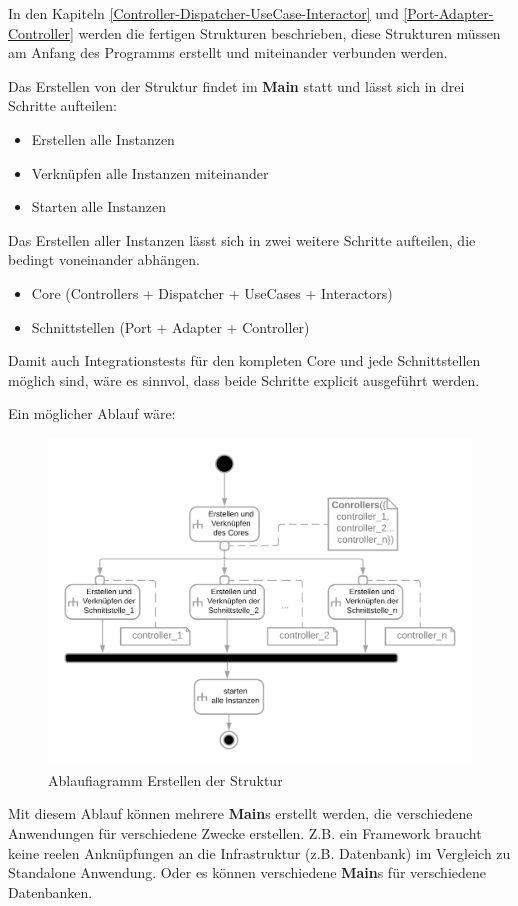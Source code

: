 In den Kapiteln \ref{Controller-Dispatcher-UseCase-Interactor} und \ref{Port-Adapter-Controller} 
werden die fertigen Strukturen beschrieben, diese Strukturen müssen am Anfang des Programms erstellt
und miteinander verbunden werden.

Das Erstellen von der Struktur findet im \textbf{Main} statt und lässt sich in drei Schritte aufteilen:
\begin{itemize}
    \item Erstellen alle Instanzen
    \item Verknüpfen alle Instanzen miteinander
    \item Starten alle Instanzen
\end{itemize}

Das Erstellen aller Instanzen lässt sich in zwei weitere Schritte aufteilen, die bedingt voneinander abhängen.
\begin{itemize}
    \item Core (Controllers + Dispatcher + UseCases + Interactors)
    \item Schnittstellen (Port + Adapter + Controller)
\end{itemize}

Damit auch Integrationstests für den kompleten Core und jede Schnittstellen möglich sind, wäre es sinnvol, dass beide Schritte
explicit ausgeführt werden.

Ein möglicher Ablauf wäre:
\begin{figure}[H]
    \centering
    \includegraphics[width=12cm]{./images/Erstellen AD.png}
     \caption[Ablaufiagramm Erstellen der Struktur]{Ablaufiagramm Erstellen der Struktur \footnotemark}
     \label{fig:ADCreate}
\end{figure}

Mit diesem Ablauf können mehrere \textbf{Main}s erstellt werden, die verschiedene Anwendungen für verschiedene Zwecke erstellen.
Z.B. ein Framework braucht keine reelen Anknüpfungen an die Infrastruktur (z.B. Datenbank) im Vergleich zu Standalone Anwendung.
Oder es können verschiedene \textbf{Main}s für verschiedene Datenbanken.
